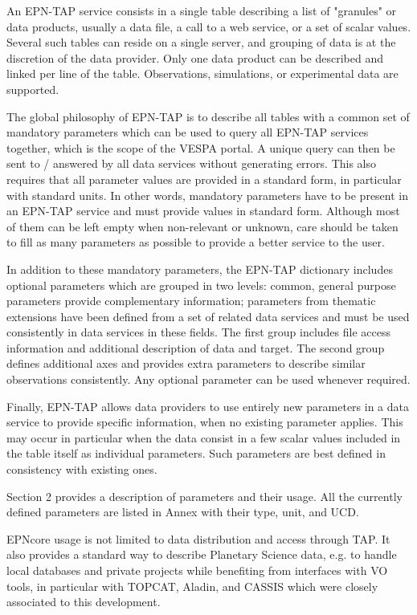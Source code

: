 \documentclass[11pt,a4paper]{ivoa}
\begin{document}
An EPN-TAP service consists in a single table describing a list of "granules" or data products, usually a data file, a call to a web service, or a set of scalar values. Several such tables can reside on a single server, and grouping of data is at the discretion of the data provider. Only one data product can be described and linked per line of the table. Observations, simulations, or experimental data are supported. 

The global philosophy of EPN-TAP is to describe all tables with a common set of mandatory parameters which can be used to query all EPN-TAP services together, which is the scope of the VESPA portal. A unique query can then be sent to / answered by all data services without generating errors. This also requires that all parameter values are provided in a standard form, in particular with standard units. In other words, mandatory parameters have to be present in an EPN-TAP service and must provide values in standard form. Although most of them can be left empty when non-relevant or unknown, care should be taken to fill as many parameters as possible to provide a better service to the user.  

In addition to these mandatory parameters, the EPN-TAP dictionary includes optional parameters which are grouped in two levels: common, general purpose parameters provide complementary information; parameters from thematic extensions have been defined from a set of related data services and must be used consistently in data services in these fields. The first group includes file access information and additional description of data and target. The second group defines additional axes and provides extra parameters to describe similar observations consistently. Any optional parameter can be used whenever required. 

Finally, EPN-TAP allows data providers to use entirely new parameters in a data service to provide specific information, when no existing parameter applies. This may occur in particular when the data consist in a few scalar values included in the table itself as individual parameters. Such parameters are best defined in consistency with existing ones. 

Section 2 provides a description of parameters and their usage. All the currently defined parameters are listed in Annex with their type, unit, and UCD. 

EPNcore usage is not limited to data distribution and access through TAP. It also provides a standard way to describe Planetary Science data, e.g. to handle local databases and private projects while benefiting from interfaces with VO tools, in particular with TOPCAT, Aladin, and CASSIS which were closely associated to this development. 
\end{document}
